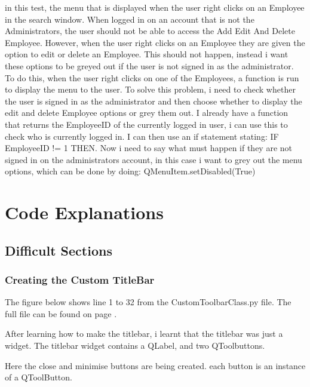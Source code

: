 in this test, the menu that is displayed when the user right clicks on an Employee in the search window. When logged in on an account that is not the Administrators, the user should not be able to access the Add Edit And Delete Employee. However, when the user right clicks on an Employee they are given the option to edit or delete an Employee. This should not happen, instead i want these options to be greyed out if the user is not signed in as the administrator. To do this, when the user right clicks on one of the Employees, a function is run to display the menu to the user. To solve this problem, i need to check whether the user is signed in as the administrator and then choose whether to display the edit and delete Employee options or grey them out. I already have a function that returns the EmployeeID of the currently logged in user, i can use this to check who is currently logged in. I can then use an if statement stating: IF EmployeeID != 1 THEN. Now i need to say what must happen if they are not signed in on the administrators account, in this case i want to grey out the menu options, which can be done by doing: QMenuItem.setDisabled(True)
\pagebreak

\section{Code Explanations}

\subsection{Difficult Sections}

\subsubsection{Creating the Custom TitleBar} 

The figure below shows line 1 to 32 from the CustomToolbarClass.py file. The full file can be found on page \pageref{fig:CustomToolbarClass}.


After learning how to make the titlebar, i learnt that the titlebar was just a widget. The titlebar widget contains a QLabel, and two QToolbuttons.


Here the close and minimise buttons are being created. each button is an instance of a QToolButton. 

